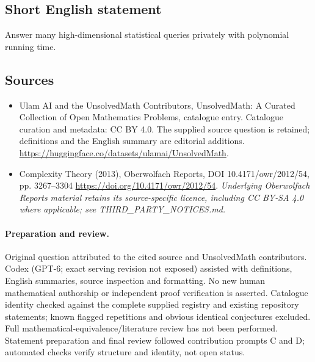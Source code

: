 \documentclass[11pt]{article}
\begin{document}
\subsection{Short English statement}
Answer many high-dimensional statistical queries privately with polynomial running time.
\subsection{Sources}
\begin{itemize}
\item[\hypertarget{source:statement:1}{S1}] Ulam AI and the UnsolvedMath Contributors, UnsolvedMath: A Curated Collection of Open Mathematics Problems, catalogue entry. Catalogue curation and metadata: CC BY 4.0. The supplied source question is retained; definitions and the English summary are editorial additions.
\url{https://huggingface.co/datasets/ulamai/UnsolvedMath}.
\item[\hypertarget{source:statement:2}{S2}] Complexity Theory (2013), Oberwolfach Reports, DOI 10.4171/owr/2012/54, pp. 3267--3304
\url{https://doi.org/10.4171/owr/2012/54}.
\textit{Underlying Oberwolfach Reports material retains its source-specific licence, including CC BY-SA 4.0 where applicable; see THIRD\_PARTY\_NOTICES.md.}
\end{itemize}
\paragraph{Preparation and review.}
Original question attributed to the cited source and UnsolvedMath contributors. Codex (GPT-6; exact serving revision not exposed) assisted with definitions, English summaries, source inspection and formatting. No new human mathematical authorship or independent proof verification is asserted. Catalogue identity checked against the complete supplied registry and existing repository statements; known flagged repetitions and obvious identical conjectures excluded. Full mathematical-equivalence/literature review has not been performed. Statement preparation and final review followed contribution prompts C and D; automated checks verify structure and identity, not open status.
\label{end:statement}
\end{document}
